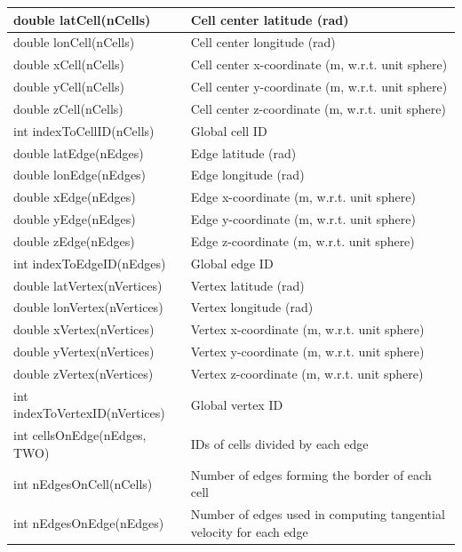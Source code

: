 \documentclass[11pt]{report}
\begin{document}
{\small
\begin{longtable}{|p{2.75in} |p{3.5in}|}
 \hline
        double latCell(nCells)       & Cell center latitude (rad) \\ \hline
        double lonCell(nCells)       & Cell center longitude (rad) \\ \hline
        double xCell(nCells)         & Cell center x-coordinate (m, w.r.t. unit sphere) \\ \hline
        double yCell(nCells)         & Cell center y-coordinate (m, w.r.t. unit sphere) \\ \hline
        double zCell(nCells)         & Cell center z-coordinate (m, w.r.t. unit sphere) \\ \hline
        int indexToCellID(nCells)    & Global cell ID \\ \hline
        double latEdge(nEdges)       & Edge latitude (rad) \\ \hline
        double lonEdge(nEdges)       & Edge longitude (rad) \\ \hline
        double xEdge(nEdges)         & Edge x-coordinate (m, w.r.t. unit sphere) \\ \hline
        double yEdge(nEdges)         & Edge y-coordinate (m, w.r.t. unit sphere) \\ \hline
        double zEdge(nEdges)         & Edge z-coordinate (m, w.r.t. unit sphere) \\ \hline
        int indexToEdgeID(nEdges)    & Global edge ID \\ \hline
        double latVertex(nVertices)      & Vertex latitude (rad) \\ \hline
        double lonVertex(nVertices)      & Vertex longitude (rad) \\ \hline
        double xVertex(nVertices)        & Vertex x-coordinate (m, w.r.t. unit sphere) \\ \hline
        double yVertex(nVertices)        & Vertex y-coordinate (m, w.r.t. unit sphere) \\ \hline
        double zVertex(nVertices)        & Vertex z-coordinate (m, w.r.t. unit sphere) \\ \hline
        int indexToVertexID(nVertices)   & Global vertex ID \\ \hline
        int cellsOnEdge(nEdges, TWO)     & IDs of cells divided by each edge \\ \hline
        int nEdgesOnCell(nCells)         & Number of edges forming the border of each cell \\ \hline
        int nEdgesOnEdge(nEdges)         & Number of edges used in computing tangential velocity for each edge \\ \hline

\end{longtable}}
\end{document}
